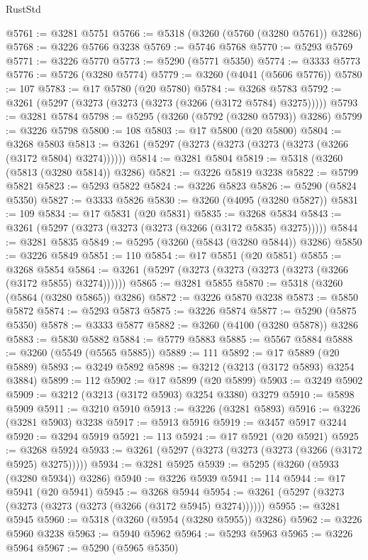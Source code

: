 \begin{lexlean}{RustStd}
\begin{coremodule}
@5761 := @3281 @5751
@5766 := @5318 (@3260 (@5760 (@3280 @5761)) @3286)
@5768 := @3226 @5766 @3238
@5769 := @5746 @5768
@5770 := @5293 @5769
@5771 := @3226 @5770
@5773 := @5290 (@5771 @5350)
@5774 := @3333 @5773
@5776 := @5726 (@3280 @5774)
@5779 := @3260 (@4041 (@5606 @5776))
@5780 := 107
@5783 := @17 @5780 (@20 @5780)
@5784 := @3268 @5783
@5792 := @3261 (@5297 (@3273 (@3273 (@3273 (@3266 (@3172 @5784) @3275)))))
@5793 := @3281 @5784
@5798 := @5295 (@3260 (@5792 (@3280 @5793)) @3286)
@5799 := @3226 @5798
@5800 := 108
@5803 := @17 @5800 (@20 @5800)
@5804 := @3268 @5803
@5813 := @3261 (@5297 (@3273 (@3273 (@3273 (@3273 (@3266 (@3172 @5804) @3274))))))
@5814 := @3281 @5804
@5819 := @5318 (@3260 (@5813 (@3280 @5814)) @3286)
@5821 := @3226 @5819 @3238
@5822 := @5799 @5821
@5823 := @5293 @5822
@5824 := @3226 @5823
@5826 := @5290 (@5824 @5350)
@5827 := @3333 @5826
@5830 := @3260 (@4095 (@3280 @5827))
@5831 := 109
@5834 := @17 @5831 (@20 @5831)
@5835 := @3268 @5834
@5843 := @3261 (@5297 (@3273 (@3273 (@3273 (@3266 (@3172 @5835) @3275)))))
@5844 := @3281 @5835
@5849 := @5295 (@3260 (@5843 (@3280 @5844)) @3286)
@5850 := @3226 @5849
@5851 := 110
@5854 := @17 @5851 (@20 @5851)
@5855 := @3268 @5854
@5864 := @3261 (@5297 (@3273 (@3273 (@3273 (@3273 (@3266 (@3172 @5855) @3274))))))
@5865 := @3281 @5855
@5870 := @5318 (@3260 (@5864 (@3280 @5865)) @3286)
@5872 := @3226 @5870 @3238
@5873 := @5850 @5872
@5874 := @5293 @5873
@5875 := @3226 @5874
@5877 := @5290 (@5875 @5350)
@5878 := @3333 @5877
@5882 := @3260 (@4100 (@3280 @5878)) @3286
@5883 := @5830 @5882
@5884 := @5779 @5883
@5885 := @5567 @5884
@5888 := @3260 (@5549 (@5565 @5885))
@5889 := 111
@5892 := @17 @5889 (@20 @5889)
@5893 := @3249 @5892
@5898 := @3212 (@3213 (@3172 @5893) @3254 @3884)
@5899 := 112
@5902 := @17 @5899 (@20 @5899)
@5903 := @3249 @5902
@5909 := @3212 (@3213 (@3172 @5903) @3254 @3380) @3279
@5910 := @5898 @5909
@5911 := @3210 @5910
@5913 := @3226 (@3281 @5893)
@5916 := @3226 (@3281 @5903) @3238
@5917 := @5913 @5916
@5919 := @3457 @5917 @3244
@5920 := @3294 @5919
@5921 := 113
@5924 := @17 @5921 (@20 @5921)
@5925 := @3268 @5924
@5933 := @3261 (@5297 (@3273 (@3273 (@3273 (@3266 (@3172 @5925) @3275)))))
@5934 := @3281 @5925
@5939 := @5295 (@3260 (@5933 (@3280 @5934)) @3286)
@5940 := @3226 @5939
@5941 := 114
@5944 := @17 @5941 (@20 @5941)
@5945 := @3268 @5944
@5954 := @3261 (@5297 (@3273 (@3273 (@3273 (@3273 (@3266 (@3172 @5945) @3274))))))
@5955 := @3281 @5945
@5960 := @5318 (@3260 (@5954 (@3280 @5955)) @3286)
@5962 := @3226 @5960 @3238
@5963 := @5940 @5962
@5964 := @5293 @5963
@5965 := @3226 @5964
@5967 := @5290 (@5965 @5350)

\end{coremodule}
\end{lexlean}
